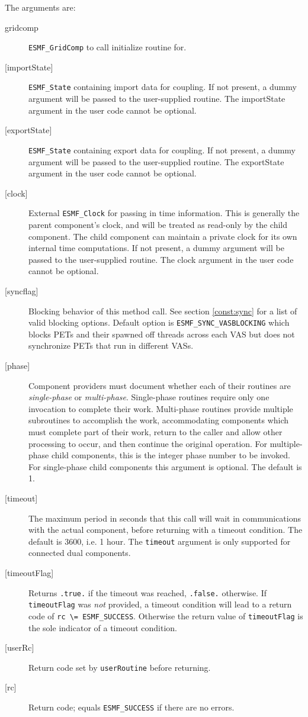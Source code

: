    The arguments are:
   \begin{description}
   \item[gridcomp]
     {\tt ESMF\_GridComp} to call initialize routine for.
   \item[{[importState]}]
     {\tt ESMF\_State} containing import data for coupling. If not present, a dummy
     argument will be passed to the user-supplied routine.  The
     importState argument in the user code cannot be optional.
   \item[{[exportState]}]
     {\tt ESMF\_State} containing export data for coupling. If not present, a dummy
     argument will be passed to the user-supplied routine.  The
     exportState argument in the user code cannot be optional.
   \item[{[clock]}]
     External {\tt ESMF\_Clock} for passing in time information.
     This is generally the parent component's clock, and will be treated
     as read-only by the child component.  The child component can maintain
     a private clock for its own internal time computations. If not present, a dummy
     argument will be passed to the user-supplied routine.  The
     clock argument in the user code cannot be optional.
   \item[{[syncflag]}]
     Blocking behavior of this method call. See section \ref{const:sync}
     for a list of valid blocking options. Default option is
     {\tt ESMF\_SYNC\_VASBLOCKING} which blocks PETs and their spawned off threads
     across each VAS but does not synchronize PETs that run in different VASs.
   \item[{[phase]}]
     Component providers must document whether each of their
     routines are {\em single-phase} or {\em multi-phase}.
     Single-phase routines require only one invocation to complete
     their work.
     Multi-phase routines provide multiple subroutines to accomplish
     the work, accommodating components which must complete part of their
     work, return to the caller and allow other processing to occur,
     and then continue the original operation.
     For multiple-phase child components, this is the integer phase
     number to be invoked.
     For single-phase child components this argument is optional. The default is
     1.
   \item[{[timeout]}]
     The maximum period in seconds that this call will wait in communications
     with the actual component, before returning with a timeout condition.
     The default is 3600, i.e. 1 hour. The {\tt timeout} argument is only
     supported for connected dual components.
   \item[{[timeoutFlag]}]
     Returns {\tt .true.} if the timeout was reached, {\tt .false.} otherwise.
     If {\tt timeoutFlag} was {\em not} provided, a timeout condition will lead
     to a return code of {\tt rc \textbackslash = ESMF\_SUCCESS}. Otherwise the
     return value of {\tt timeoutFlag} is the sole indicator of a timeout
     condition.
   \item[{[userRc]}]
     Return code set by {\tt userRoutine} before returning.
   \item[{[rc]}]
     Return code; equals {\tt ESMF\_SUCCESS} if there are no errors.
   \end{description}
   
